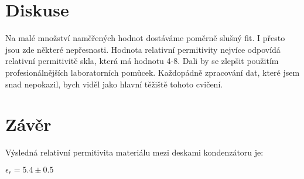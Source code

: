 	

	\section{Diskuse}
Na malé množství naměřených hodnot dostáváme poměrně slušný fit.
I přesto jsou zde některé nepřesnosti. Hodnota relativní permitivity nejvíce odpovídá relativní permitivitě skla, která má hodnotu 4-8.   Dali by se zlepšit použitím profesionálnějších laboratorních pomůcek. Každopádně zpracování dat, které jsem snad nepokazil, bych viděl jako hlavní těžiště tohoto cvičení. 

			

		

			
\section{Závěr}
		Výsledná relativní permitivita materiálu mezi deskami kondenzátoru je: \newline \begin{center}
			$\epsilon_r =5.4 \pm 0.5$
		\end{center}
		
	



